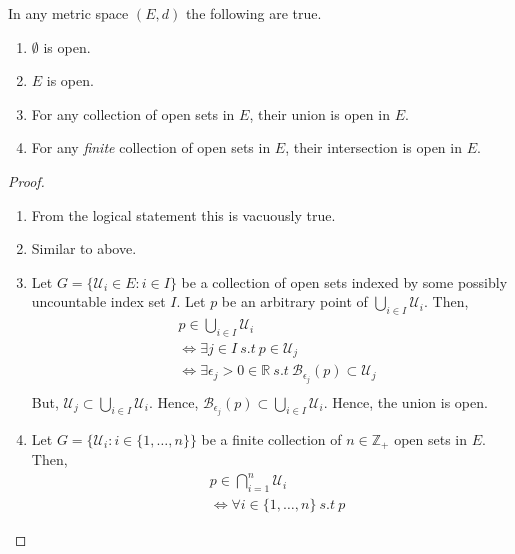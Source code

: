 \begin{Theorem}[name=Properties of open sets]
    In any metric space $(E,d)$ the following are true.    
    \begin{enumerate}
	\item $\emptyset$ is open.
	\item $E$ is open.
	\item For any collection of open sets in $E$, their union is open in $E$.
	\item For any \emph{finite} collection of open sets in $E$, their intersection is open in 
	    $E$.
    \end{enumerate}
\end{Theorem}
\begin{proof}

    
    

    \begin{enumerate}
	\item From the logical statement this is vacuously true.
	\item Similar to above.
	\item Let $G = \left.\lbrace \mathcal{U}_i \in E : i \in I \rbrace\right.$ be a 
	    collection of open sets indexed by some possibly uncountable index set $I$. Let
	    $p$ be an arbitrary point of $\bigcup_{i\in I} \mathcal{U}_i$. Then,
	    \begin{displaymath}
		\begin{aligned}
		   & p \in \bigcup_{i\in I} \mathcal{U}_i \\
		   & \Leftrightarrow \exists j \in I \ s.t \ p \in \mathcal{U}_j \\
		   & \Leftrightarrow \exists \epsilon_j > 0 \in \mathbb{R} \ s.t \ 
		       \mathcal{B}_{\epsilon_j}(p) \subset \mathcal{U}_j \\
		\end{aligned}
	    \end{displaymath}
	    But, $\mathcal{U}_j \subset \bigcup_{i\in I} \mathcal{U}_i$. Hence, 
	    $\mathcal{B}_{\epsilon_j}(p) \subset \bigcup_{i\in I} \mathcal{U}_i$. Hence, the union
	    is open.
	\item Let $G = \left.\lbrace \mathcal{U}_i : i \in \lbrace 1, \dots, n\rbrace
		\rbrace\right.$ be a finite collection of $n \in \mathbb{Z}_+$ open sets in $E$.
	    Then,
	    \begin{displaymath}
		\begin{aligned}
		   & p \in \bigcap_{i = 1}^n \mathcal{U}_i \\
		   & \Leftrightarrow \forall i \in \lbrace 1,\dots,n \rbrace \ s.t \ p 

\end{aligned}
\end{displaymath}
\end{enumerate}
\end{proof}
